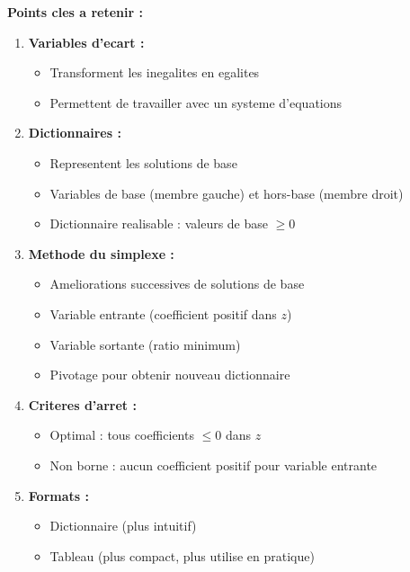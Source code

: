 \documentclass[12pt,a4paper]{article}
\begin{document}
\begin{important}
\textbf{Points cles a retenir :}

\begin{enumerate}
    \item \textcolor{titrebleu}{\textbf{Variables d'ecart :}}
    \begin{itemize}
        \item Transforment les inegalites en egalites
        \item Permettent de travailler avec un systeme d'equations
    \end{itemize}
    
    \item \textcolor{defvert}{\textbf{Dictionnaires :}}
    \begin{itemize}
        \item Representent les solutions de base
        \item Variables de base (membre gauche) et hors-base (membre droit)
        \item Dictionnaire realisable : valeurs de base $\geq 0$
    \end{itemize}
    
    \item \textcolor{algoviolet}{\textbf{Methode du simplexe :}}
    \begin{itemize}
        \item Ameliorations successives de solutions de base
        \item Variable entrante (coefficient positif dans $z$)
        \item Variable sortante (ratio minimum)
        \item Pivotage pour obtenir nouveau dictionnaire
    \end{itemize}
    
    \item \textcolor{exempleorange}{\textbf{Criteres d'arret :}}
    \begin{itemize}
        \item Optimal : tous coefficients $\leq 0$ dans $z$
        \item Non borne : aucun coefficient positif pour variable entrante
    \end{itemize}
    
    \item \textcolor{importantrouge}{\textbf{Formats :}}
    \begin{itemize}
        \item Dictionnaire (plus intuitif)
        \item Tableau (plus compact, plus utilise en pratique)
    \end{itemize}
\end{enumerate}
\end{important}
\end{document}
